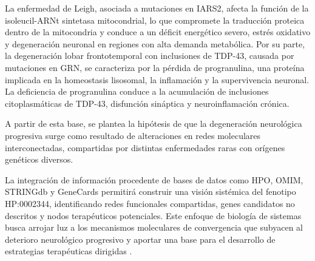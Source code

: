 La enfermedad de Leigh, asociada a mutaciones en IARS2, afecta la función de la isoleucil-ARNt sintetasa mitocondrial, lo que compromete la traducción proteica dentro de la mitocondria y conduce a un déficit energético severo, estrés oxidativo y degeneración neuronal en regiones con alta demanda metabólica.
Por su parte, la degeneración lobar frontotemporal con inclusiones de TDP-43, causada por mutaciones en GRN, se caracteriza por la pérdida de progranulina, una proteína implicada en la homeostasis lisosomal, la inflamación y la supervivencia neuronal. La deficiencia de progranulina conduce a la acumulación de inclusiones citoplasmáticas de TDP-43, disfunción sináptica y neuroinflamación crónica.

A partir de esta base, se plantea la hipótesis de que la degeneración neurológica progresiva surge como resultado de alteraciones en redes moleculares interconectadas, compartidas por distintas enfermedades raras con orígenes genéticos diversos. 

La integración de información procedente de bases de datos como HPO, OMIM, STRINGdb y GeneCards permitirá construir una visión sistémica del fenotipo HP:0002344, identificando redes funcionales compartidas, genes candidatos no descritos y nodos terapéuticos potenciales. Este enfoque de biología de sistemas busca arrojar luz a los mecanismos moleculares de convergencia que subyacen al deterioro neurológico progresivo y aportar una base para el desarrollo de estrategias terapéuticas dirigidas \cite{ref6,ref7,ref8}.